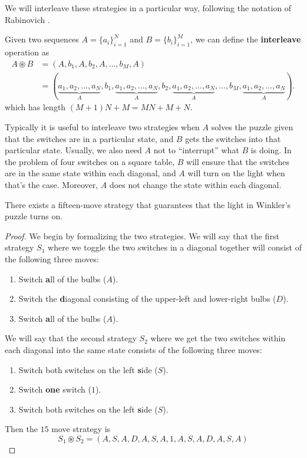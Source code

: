 We will interleave these strategies in a particular way, following the notation
of Rabinovich \cite{Rabinovich2022}.

\begin{definition}
  Given two sequences $A = \{a_i\}_{i=1}^N$ and $B = \{b_i\}_{i=1}^M$, we can
  define the \textbf{interleave} operation as \begin{align}
    A \circledast B &= (A,b_1,A,b_2,A,\dots,b_M,A) \\
      &= (
      \underbrace{a_1, a_2, \dots, a_N}_A,
      b_1,
      \underbrace{a_1, a_2, \dots, a_N}_A,
      b_2,
      \underbrace{a_1, a_2, \dots, a_N}_A,
      \dots,
      b_M,
      \underbrace{a_1, a_2, \dots, a_N}_A).
  \end{align} which has length $(M+1)N + M = MN + M + N$.
\end{definition}

Typically it is useful to interleave two strategies when
$A$ solves the puzzle given that the switches are in a particular state, and
$B$ gets the switches into that particular state.
Usually, we also need $A$ not to ``interrupt'' what $B$ is doing.
In the problem of four switches on a square table,
$B$ will ensure that the switches are in the same state within each diagonal,
and $A$ will turn on the light when that's the case.
Moreover, $A$ does not change the state within each diagonal.

\begin{proposition}
  There exists a fifteen-move strategy that guarantees that the light in
  Winkler's puzzle turns on.
  \label{prop:WinklersSolution}
\end{proposition}
\begin{proof}
  We begin by formalizing the two strategies. We will say that the first
  strategy $S_1$ where we toggle the two switches in a diagonal together
  will consist of the following three moves: \begin{enumerate}
    \item Switch \textbf{a}ll of the bulbs ($A$).
    \item Switch the \textbf{d}iagonal consisting of the upper-left and lower-right bulbs ($D$).
    \item Switch \textbf{a}ll of the bulbs ($A$).
  \end{enumerate}
  We will say that the second strategy $S_2$ where we get the two switches
  within each diagonal into the same state consists of the following three
  moves: \begin{enumerate}
    \item Switch both switches on the left \textbf{s}ide ($S$).
    \item Switch \textbf{one} switch ($1$).
    \item Switch both switches on the left \textbf{s}ide ($S$).
  \end{enumerate}
  Then the $15$ move strategy is \begin{equation}
    S_1 \circledast S_2 = (A, S, A, D, A, S, A, 1, A, S, A, D, A, S, A)
  \end{equation}
\end{proof}

